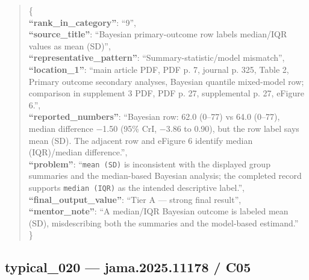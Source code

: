 \documentclass[
  letterpaper,
  9pt]{extreport}
\begin{document}
\begin{quote}
\{\\
\textbf{``rank\_in\_category''}: ``9'',\\
\textbf{``source\_title''}: ``Bayesian primary-outcome row labels
median/IQR values as mean (SD)'',\\
\textbf{``representative\_pattern''}: ``Summary-statistic/model
mismatch'',\\
\textbf{``location\_1''}: ``main article PDF, PDF p. 7, journal p. 325,
Table 2, Primary outcome secondary analyses, Bayesian quantile
mixed-model row; comparison in supplement 3 PDF, PDF p. 27, supplemental
p. 27, eFigure 6.'',\\
\textbf{``reported\_numbers''}: ``Bayesian row: 62.0 (0--77) vs 64.0
(0--77), median difference −1.50 (95\% CrI, −3.86 to 0.90), but the row
label says mean (SD). The adjacent row and eFigure 6 identify median
(IQR)/median difference.'',\\
\textbf{``problem''}: ``\texttt{mean\ (SD)} is inconsistent with the
displayed group summaries and the median-based Bayesian analysis; the
completed record supports \texttt{median\ (IQR)} as the intended
descriptive label.'',\\
\textbf{``final\_output\_value''}: ``Tier A --- strong final result'',\\
\textbf{``mentor\_note''}: ``A median/IQR Bayesian outcome is labeled
mean (SD), misdescribing both the summaries and the model-based
estimand.''\\
\}
\end{quote}

\hypertarget{typical_020--jama202511178--c05}{%
\subsection{typical\_020 --- jama.2025.11178 /
C05}\label{typical_020--jama202511178--c05}}
\end{document}
